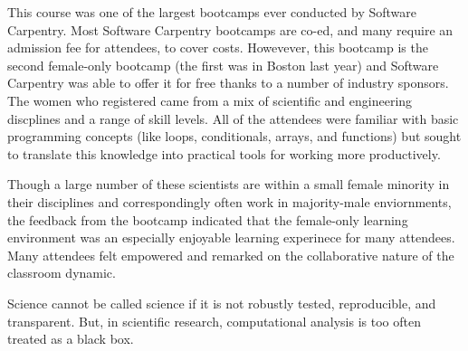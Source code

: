 \documentclass[letterpaper]{article}
\begin{document}
This course was one of the largest bootcamps ever conducted by Software 
Carpentry. Most Software Carpentry bootcamps are co-ed, and many require an 
admission fee for attendees, to cover costs.  Howevever, this bootcamp is the 
second female-only bootcamp (the first was in Boston last year) 
and Software Carpentry was able to offer it for free thanks to a number of 
industry sponsors.  The women who registered came from a mix of scientific 
and engineering discplines and a range of skill levels. All of the attendees 
were familiar with basic programming concepts (like loops, conditionals, arrays, 
and functions) but sought to translate this knowledge into 
practical tools for working more productively.

Though a large number of these scientists are within a small female minority in 
their disciplines and correspondingly often work in majority-male enviornments, 
the feedback from the bootcamp indicated that the female-only learning 
environment was an especially enjoyable learning experinece for many attendees.  
Many attendees felt empowered and remarked on the collaborative nature of the 
classroom dynamic. 

Science cannot be called science if it is not robustly tested, reproducible, and 
transparent. But, in scientific research, computational analysis is too often 
treated as a black box. 





\end{document}
